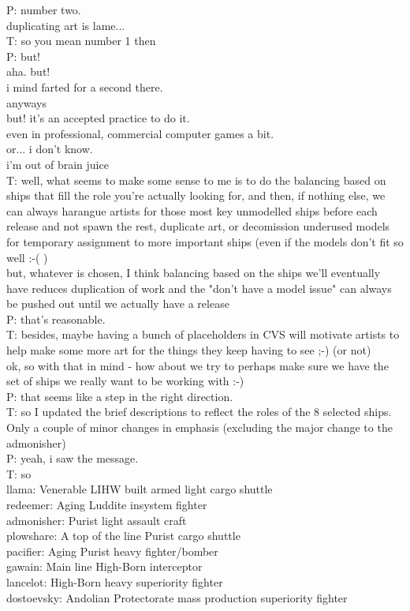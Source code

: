 P: number two.\\
duplicating art is lame...\\
T: so you mean number 1 then\\
P: but!\\
aha. but!\\
i mind farted for a second there.\\
anyways\\
but! it's an accepted practice to do it. \\
even in professional, commercial computer games a bit.\\
or... i don't know.\\
i'm out of brain juice\\
T: well, what seems to make some sense to me is to do the balancing based on ships that fill the role you're actually looking for, and then, if nothing else, we can always harangue artists for those most key unmodelled ships before each release and not spawn the rest, duplicate art, or decomission underused models for temporary assignment to more important ships (even if the models don't fit so well :-( )\\
but, whatever is chosen, I think balancing based on the ships we'll eventually have reduces duplication of work and the "don't have a model issue" can always be pushed out until we actually have a release\\
P: that's reasonable.\\
T: besides, maybe having a bunch of placeholders in CVS will motivate artists to help make some more art for the things they keep having to see ;-) (or not)\\
ok, so with that in mind - how about we try to perhaps make sure we have the set of ships we really want to be working with :-)\\
P: that seems like a step in the right direction.\\
T: so I updated the brief descriptions to reflect the roles of the 8 selected ships. Only a couple of minor changes in emphasis (excluding the major change to the admonisher)\\
P: yeah, i saw the message.\\
T: so\\
llama: Venerable LIHW built armed light cargo shuttle\\
redeemer: Aging Luddite insystem fighter\\
admonisher: Purist light assault craft\\
plowshare: A top of the line Purist cargo shuttle\\
pacifier: Aging Purist heavy fighter/bomber\\
gawain: Main line High-Born interceptor\\
lancelot: High-Born heavy superiority fighter\\
dostoevsky: Andolian Protectorate mass production superiority fighter\\

